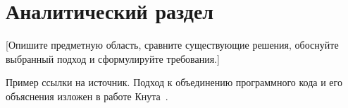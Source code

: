 \section{Аналитический раздел}

[Опишите предметную область, сравните существующие решения, обоснуйте
выбранный подход и сформулируйте требования.]

Пример ссылки на источник. Подход к объединению программного кода и его
объяснения изложен в работе Кнута~\cite{knuth1984}.


